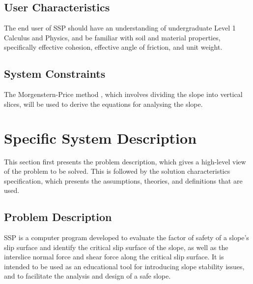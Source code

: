 \documentclass[12pt]{article}
\begin{document}
\subsection{User Characteristics}
\label{Sec:UserChars}
The end user of SSP should have an understanding of undergraduate Level 1 Calculus and Physics, and be familiar with soil and material properties, specifically effective cohesion, effective angle of friction, and unit weight.
\subsection{System Constraints}
\label{Sec:SysConstraints}
The Morgenstern-Price method \cite{morgenstern1965}, which involves dividing the slope into vertical slices, will be used to derive the equations for analysing the slope.
\section{Specific System Description}
\label{Sec:SpecSystDesc}
This section first presents the problem description, which gives a high-level view of the problem to be solved. This is followed by the solution characteristics specification, which presents the assumptions, theories, and definitions that are used.
\subsection{Problem Description}
\label{Sec:ProbDesc}
SSP is a computer program developed to evaluate the factor of safety of a slope's slip surface and identify the critical slip surface of the slope, as well as the interslice normal force and shear force along the critical slip surface. It is intended to be used as an educational tool for introducing slope stability issues, and to facilitate the analysis and design of a safe slope.
\end{document}
